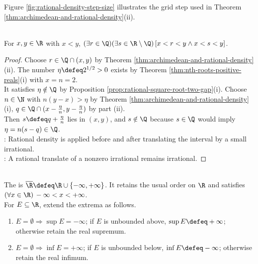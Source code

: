 \begin{illustrationfigure}[H]
  \centering
  
  \caption{Choose $n$ so the spacing $\frac{1}{n}$ is smaller than $b-a$; then one grid point $\frac{m}{n}$ falls inside $(a,b)$.}
  \label{fig:rational-density-step-size}
\end{illustrationfigure}
Figure \ref{fig:rational-density-step-size} illustrates the grid step used in Theorem \ref{thm:archimedean-and-rational-density}(ii).

\begin{corollary} \label{cor:rationals-and-irrationals-dense} \\
For $x,y\in\R$ with $x<y$, $(\exists r\in\Q)(\exists s\in\R\setminus\Q)\,[x<r<y\land x<s<y]$.
\begin{proof}
Choose $r\in\Q\cap(x,y)$ by Theorem \ref{thm:archimedean-and-rational-density}(ii). The number $\eta\defeq2^{1/2}>0$ exists by Theorem \ref{thm:nth-roots-positive-reals}(i) with $x=n=2$.\\
It satisfies $\eta\notin\Q$ by Proposition \ref{prop:rational-square-root-two-gap}(i). Choose $n\in\N$ with $n(y-x)>\eta$ by Theorem \ref{thm:archimedean-and-rational-density}(i), $q\in\Q\cap(x-\frac{\eta}{n},y-\frac{\eta}{n})$ by part (ii).\\
Then $s\defeq q+\frac{\eta}{n}$ lies in $(x,y)$, and $s\notin\Q$ because $s\in\Q$ would imply $\eta=n(s-q)\in\Q$.\\
: Rational density is applied before and after translating the interval by a small irrational.\\
: A rational translate of a nonzero irrational remains irrational.
\end{proof}
\end{corollary}

\begin{definition} \label{def:extended-real-number-system} \\
The  is $\overline{\R}\defeq\R\cup\{-\infty,+\infty\}$. It retains the usual order on $\R$ and satisfies $(\forall x\in\R)\,-\infty<x<+\infty$.\\
For $E\subseteq\R$, extend the extrema as follows.
\begin{enumerate}[label=(\roman*)]
\setlength{\itemsep}{0pt}
\item $E=\emptyset\Rightarrow\sup E=-\infty$; if $E$ is unbounded above, $\sup E\defeq+\infty$; otherwise retain the real supremum.
\item $E=\emptyset\Rightarrow\inf E=+\infty$; if $E$ is unbounded below, $\inf E\defeq-\infty$; otherwise retain the real infimum.
\end{enumerate}
\end{definition}

